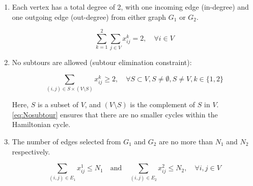 \documentclass{article}
\begin{document}
\begin{enumerate}
  \item Each vertex has a total degree of 2, with one incoming edge (in-degree) and one
        outgoing edge (out-degree) from either graph $G_1$ or $G_2$.

        \begin{equation*}
          \sum_{k=1}^{2} \sum_{j \in V} x_{ij}^k = 2, \quad \forall i \in V
        \end{equation*}
  \item No subtours are allowed (subtour elimination constraint):

        \begin{equation}
          \sum_{(i,j) \in S \times (V \setminus S)} x_{ij}^k \geq 2, \quad \forall S \subset V, S \neq \emptyset, S \neq V, k \in \{1, 2\}\label{eq:Nosubtour}
        \end{equation}

        Here, $S$ is a subset of $V$, and $(V \setminus S)$ is the complement of $S$ in
        $V$.\eqref{eq:Nosubtour} ensures that there are no smaller cycles within the
        Hamiltonian cycle.
  \item The number of edges selected from $G_1$ and $G_2$ are no more than $N_1$ and
        $N_2$ respectively.

        \begin{equation*}
          \sum_{(i,j) \in E_1} x_{ij}^1 \leq N_1 \quad \text{and} \quad \sum_{(i,j) \in E_2} x_{ij}^2 \leq N_2,  \quad \forall i,j \in V
        \end{equation*}
\end{enumerate}
\end{document}
